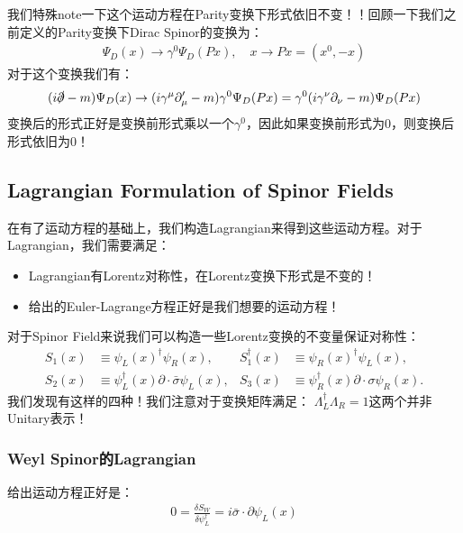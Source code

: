 
我们特殊note一下这个运动方程在Parity变换下形式依旧不变！！回顾一下我们之前定义的Parity变换下Dirac Spinor的变换为：
\begin{align}
  \Psi_D(x) \to \gamma^0 \Psi_D(Px), \quad x \to Px = (x^0,-x)
\end{align}
对于这个变换我们有：
\begin{align}
  (i\slashed{\partial}-m)\Psi_D(x) \to (i\gamma^\mu \partial_\mu' - m)
  \gamma^0 \Psi_D(Px) = \gamma^0 (i\gamma^\nu \partial_\nu - m) \Psi_D(Px)
\end{align}
变换后的形式正好是变换前形式乘以一个$ \gamma^0 $，因此如果变换前形式为0，则变换后形式依旧为0！

\subsection{Lagrangian Formulation of Spinor Fields}

在有了运动方程的基础上，我们构造Lagrangian来得到这些运动方程。对于Lagrangian，我们需要满足：
\begin{itemize}
  \item Lagrangian有Lorentz对称性，在Lorentz变换下形式是不变的！
  \item 给出的Euler-Lagrange方程正好是我们想要的运动方程！
\end{itemize}

\bigskip
{}

对于Spinor Field来说我们可以构造一些Lorentz变换的不变量保证对称性：
\begin{align}
  S_1(x)&\equiv\psi_L(x)^\dagger\psi_R(x),&S_1^\dagger(x)&\equiv\psi_R(x)^\dagger\psi_L(x),\\
  S_2(x)&\equiv\psi_L^\dagger
  (x)\partial\cdot\bar{\sigma}\psi_L(x),&S_3(x)&\equiv\psi_R^\dagger
  (x)\partial\cdot\sigma\psi_R(x).
\end{align}
我们发现有这样的四种！我们注意对于变换矩阵满足： $ \Lambda_L^\dagger \Lambda_R = 1 $这两个并非Unitary表示！

\subsubsection{Weyl Spinor的Lagrangian}

给出运动方程正好是：
\begin{align}
  0=\frac{\delta S_W}{\delta\psi_L^\dagger}=i\bar{\sigma}\cdot\partial\psi_L(x)
\end{align}

